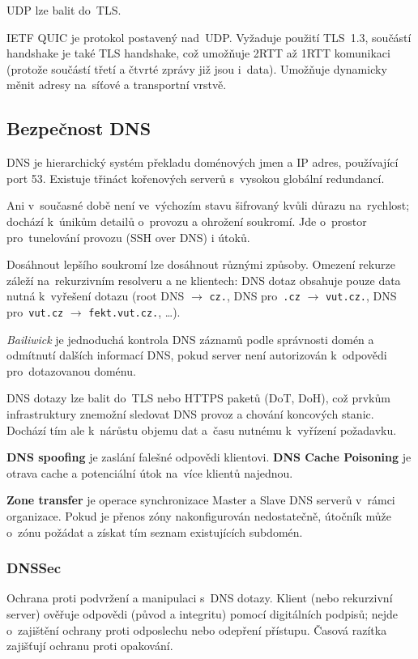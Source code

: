 UDP lze balit do~TLS.

IETF QUIC je protokol postavený nad~UDP.
Vyžaduje použití TLS~1.3, součástí handshake je také TLS handshake, což umožňuje 2RTT až 1RTT komunikaci (protože součástí třetí a čtvrté zprávy již jsou i~data).
Umožňuje dynamicky měnit adresy na~síťové a transportní vrstvě.



\subsection{Bezpečnost DNS}

DNS je hierarchický systém překladu doménových jmen a IP adres, používající port 53.
Existuje třináct kořenových serverů s~vysokou globální redundancí.

Ani v~současné době není ve~výchozím stavu šifrovaný kvůli důrazu na~rychlost; dochází k~únikům detailů o~provozu a ohrožení soukromí.
Jde o~prostor pro~tunelování provozu (SSH over DNS) i útoků.

Dosáhnout lepšího soukromí lze dosáhnout různými způsoby.
Omezení rekurze záleží na~rekurzivním resolveru a ne klientech: DNS dotaz obsahuje pouze data nutná k~vyřešení dotazu (root DNS $\rightarrow$ \texttt{cz.}, DNS pro~\texttt{.cz} $\rightarrow$ \texttt{vut.cz.}, DNS pro~\texttt{vut.cz} $\rightarrow$ \texttt{fekt.vut.cz.}, \dots).

\emph{Bailiwick} je jednoduchá kontrola DNS záznamů podle správnosti domén a odmítnutí dalších informací DNS, pokud server není autorizován k~odpovědi pro~dotazovanou doménu.

DNS dotazy lze balit do~TLS nebo HTTPS paketů  (DoT, DoH), což prvkům infrastruktury znemožní sledovat DNS provoz a chování koncových stanic.
Dochází tím ale k~nárůstu objemu dat a~času nutnému k~vyřízení požadavku.

\textbf{DNS spoofing} je zaslání falešné odpovědi klientovi.
\textbf{DNS Cache Poisoning} je otrava cache a potenciální útok na~více klientů najednou.

\textbf{Zone transfer} je operace synchronizace Master a Slave DNS serverů v~rámci organizace.
Pokud je přenos zóny nakonfigurován nedostatečně, útočník může o~zónu požádat a získat tím seznam existujících subdomén.


\subsubsection{DNSSec}

Ochrana proti podvržení a manipulaci s~DNS dotazy.
Klient (nebo rekurzivní server) ověřuje odpovědi (původ a integritu) pomocí digitálních podpisů; nejde o~zajištění ochrany proti odposlechu nebo odepření přístupu.
Časová razítka zajišťují ochranu proti opakování.


